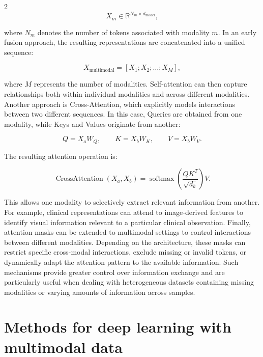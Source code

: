 \documentclass[10pt]{article}
\begin{document}
\begin{multicols}{2}
\begin{equation}
X_m \in \mathbb{R}^{N_m \times d_{\text{model}}},
\end{equation}

where \(N_m\) denotes the number of tokens associated with modality \(m\).
In an early fusion approach, 
the resulting representations are concatenated into a unified sequence:

\begin{equation}
X_{\text{multimodal}}
=
[X_1;X_2;\ldots;X_M],
\end{equation}

where \(M\) represents the number of modalities. 
Self-attention can then capture relationships both within individual modalities and across different modalities.
Another approach is Cross-Attention, which explicitly models interactions between two different sequences. 
In this case, Queries are obtained from one modality, 
while Keys and Values originate from another:

\begin{equation}
Q = X_aW_Q,\qquad
K = X_bW_K,\qquad
V = X_bW_V.
\end{equation}

The resulting attention operation is:

\begin{equation}
\operatorname{CrossAttention}(X_a,X_b)
=
\operatorname{softmax}
\left(
\frac{QK^T}{\sqrt{d_k}}
\right)V.
\end{equation}

This allows one modality to selectively extract relevant information from another. 
For example, clinical representations can attend to image-derived features to identify visual 
information relevant to a particular clinical observation.
Finally, attention masks can be extended to multimodal settings to control interactions between different modalities. 
Depending on the architecture, these masks can restrict specific cross-modal interactions, 
exclude missing or invalid tokens, or dynamically adapt the attention pattern to the available information.
Such mechanisms provide greater control over information exchange and are particularly useful 
when dealing with heterogeneous datasets containing missing modalities or varying amounts of information across samples.


\section{Methods for deep learning with multimodal data}

\end{multicols}
\end{document}
